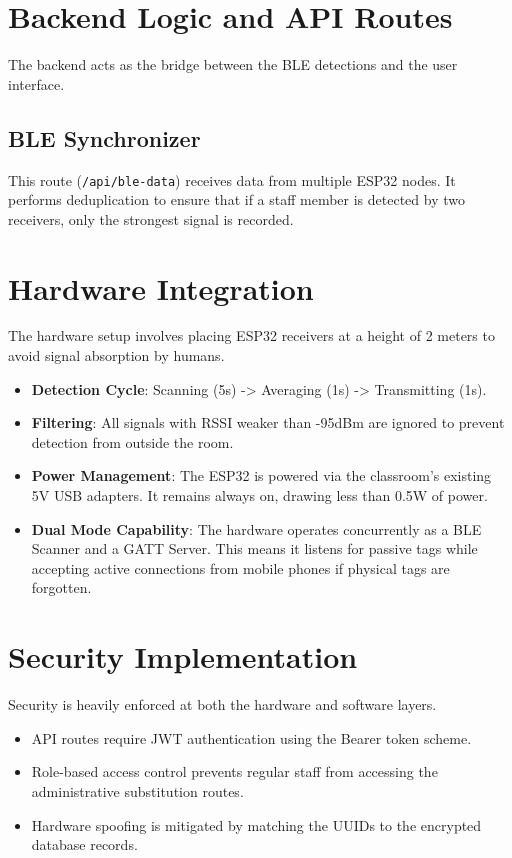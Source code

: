 \section{Backend Logic and API Routes}
The backend acts as the bridge between the BLE detections and the user interface.
\subsection{BLE Synchronizer}
This route (\texttt{/api/ble-data}) receives data from multiple ESP32 nodes. It performs deduplication to ensure that if a staff member is detected by two receivers, only the strongest signal is recorded.

\section{Hardware Integration}
The hardware setup involves placing ESP32 receivers at a height of 2 meters to avoid signal absorption by humans. 
\begin{itemize}
    \item \textbf{Detection Cycle}: Scanning (5s) -> Averaging (1s) -> Transmitting (1s).
    \item \textbf{Filtering}: All signals with RSSI weaker than -95dBm are ignored to prevent detection from outside the room.
    \item \textbf{Power Management}: The ESP32 is powered via the classroom's existing 5V USB adapters. It remains always on, drawing less than 0.5W of power.
    \item \textbf{Dual Mode Capability}: The hardware operates concurrently as a BLE Scanner and a GATT Server. This means it listens for passive tags while accepting active connections from mobile phones if physical tags are forgotten.
\end{itemize}

\section{Security Implementation}
Security is heavily enforced at both the hardware and software layers. 
\begin{itemize}
    \item API routes require JWT authentication using the Bearer token scheme. 
    \item Role-based access control prevents regular staff from accessing the administrative substitution routes.
    \item Hardware spoofing is mitigated by matching the UUIDs to the encrypted database records.
\end{itemize}
